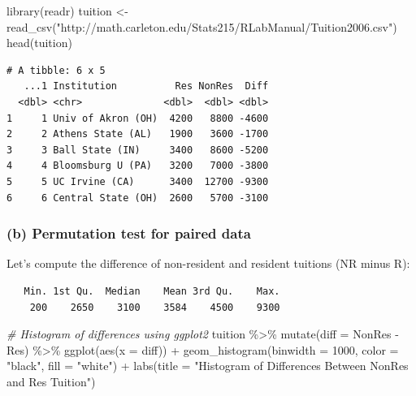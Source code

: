 \documentclass[
]{book}
\newenvironment{Shaded}{\begin{snugshade}}{\end{snugshade}}
\newcommand{\AttributeTok}[1]{\textcolor[rgb]{0.77,0.63,0.00}{#1}}
\newcommand{\CommentTok}[1]{\textcolor[rgb]{0.56,0.35,0.01}{\textit{#1}}}
\newcommand{\DecValTok}[1]{\textcolor[rgb]{0.00,0.00,0.81}{#1}}
\newcommand{\FunctionTok}[1]{\textcolor[rgb]{0.00,0.00,0.00}{#1}}
\newcommand{\NormalTok}[1]{#1}
\newcommand{\OtherTok}[1]{\textcolor[rgb]{0.56,0.35,0.01}{#1}}
\newcommand{\SpecialCharTok}[1]{\textcolor[rgb]{0.00,0.00,0.00}{#1}}
\newcommand{\StringTok}[1]{\textcolor[rgb]{0.31,0.60,0.02}{#1}}
\begin{document}
\begin{Shaded}
\begin{Highlighting}[]
\FunctionTok{library}\NormalTok{(readr)}
\NormalTok{tuition }\OtherTok{\textless{}{-}} \FunctionTok{read\_csv}\NormalTok{(}\StringTok{"http://math.carleton.edu/Stats215/RLabManual/Tuition2006.csv"}\NormalTok{)}
\FunctionTok{head}\NormalTok{(tuition)}
\end{Highlighting}
\end{Shaded}

\begin{verbatim}
# A tibble: 6 x 5
   ...1 Institution          Res NonRes  Diff
  <dbl> <chr>              <dbl>  <dbl> <dbl>
1     1 Univ of Akron (OH)  4200   8800 -4600
2     2 Athens State (AL)   1900   3600 -1700
3     3 Ball State (IN)     3400   8600 -5200
4     4 Bloomsburg U (PA)   3200   7000 -3800
5     5 UC Irvine (CA)      3400  12700 -9300
6     6 Central State (OH)  2600   5700 -3100
\end{verbatim}

\hypertarget{b-permutation-test-for-paired-data}{%
\subsubsection{(b) Permutation test for paired data}\label{b-permutation-test-for-paired-data}}

Let's compute the difference of non-resident and resident tuitions (NR minus R):

\begin{Shaded}
\end{Shaded}

\begin{verbatim}
   Min. 1st Qu.  Median    Mean 3rd Qu.    Max. 
    200    2650    3100    3584    4500    9300 
\end{verbatim}

\begin{Shaded}
\begin{Highlighting}[]
\CommentTok{\# Histogram of differences using ggplot2}
\NormalTok{tuition }\SpecialCharTok{\%\textgreater{}\%}
  \FunctionTok{mutate}\NormalTok{(}\AttributeTok{diff =}\NormalTok{ NonRes }\SpecialCharTok{{-}}\NormalTok{ Res) }\SpecialCharTok{\%\textgreater{}\%}
  \FunctionTok{ggplot}\NormalTok{(}\FunctionTok{aes}\NormalTok{(}\AttributeTok{x =}\NormalTok{ diff)) }\SpecialCharTok{+}
  \FunctionTok{geom\_histogram}\NormalTok{(}\AttributeTok{binwidth =} \DecValTok{1000}\NormalTok{, }\AttributeTok{color =} \StringTok{"black"}\NormalTok{, }\AttributeTok{fill =} \StringTok{"white"}\NormalTok{) }\SpecialCharTok{+}
  \FunctionTok{labs}\NormalTok{(}\AttributeTok{title =} \StringTok{"Histogram of Differences Between NonRes and Res Tuition"}\NormalTok{)}
\end{Highlighting}
\end{Shaded}
\end{document}
